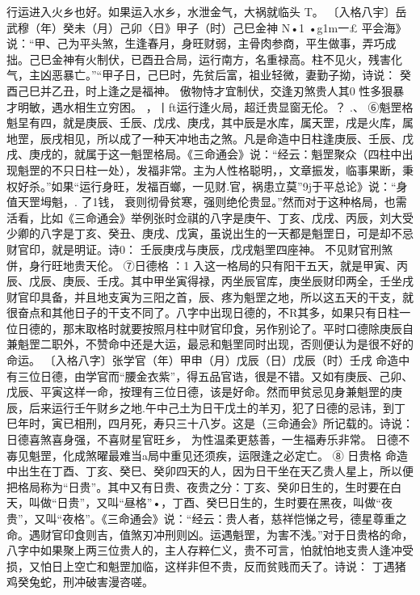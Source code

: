 行运进入火乡也好。如果运入水乡，水泄金气，大祸就临头
T。
〔入格八宇〕岳武穆（年）癸未（月）己卯〈日》甲子（时）己巳金神
N•1	•g1m一£
平会海》说：“甲、己为平头煞，生逢春月，身旺财弱，主骨肉参商，平生做事，弄巧成拙。己巳金神有火制伏，已酉丑合局，运行南方，名重禄高。柱不见火，残害化气，主凶恶暴亡。”“甲子日，己巳时，先贫后富，祖业轻微，妻勤子拗，诗说：
癸酉己巳并乙丑，时上逢之是福神。
傲物恃才宜制伏，交逢刃煞贵人其0
性多狠暴才明敏，遇水相生立穷困。
，丨ft运行逢火局，超迁贵显窗无伦。？	.、
⑥魁罡格
魁圼有四，就是庚辰、壬辰、戊戌、庚戌，其中辰是水库，属天罡，戌是火库，属地罡，辰戌相见，所以成了一种天冲地击之煞。凡是命造中日柱逢庚辰、壬辰、戊戌、庚戌的，就属于这一魁罡格局。《三命通会》说：“经云：魁罡聚众（四柱中出现魁罡的不只日柱一处），发福非常。主为人性格聪明，，文章振发，临事果断，秉权好杀。”如果“运行身旺，发福百螂，一见财.官，祸患立莫”9j于平总论》说：“身值天罡坶魁，.
了1钱，
衰则彻骨贫寒，强则绝伦贵显。”然而对于这种格局，也需活看，比如《三命通会》举例张时佥祺的八字是庚午、丁亥、戊戌、丙辰，刘大受少卿的八字是丁亥、癸丑、庚戌、戊寅，虽说出生的一天都是魁罡日，可是却不忌财官印，就是明证。诗0：
壬辰庚戌与庚辰，戊戌魁罜四座神。
不见财官刑煞併，身行旺地贵天伦。
⑦日德格	：1
入这一格局的只有阳干五天，就是甲寅、丙辰、戊辰、庚辰、壬戌。其中甲坐寅得禄，丙坐辰官库，庚坐辰财印两全，壬坐戌财官印具备，并且地支寅为三阳之首，辰、疼为魁罡之地，所以这五天的干支，就很奋点和其他日子的干支不同了。八字中出现日德的，不R其多，如果只有日柱一位日德的，那末取格时就要按照月柱中财官印食，另作别论了。平时口德除庚辰自兼魁罡二职外，不赞命中还是大运，最忌和魁罜同时出现，否则便认为是很不好的命运。
〔入格八字〕张学官（年）甲申（月）戊辰（日）戊辰（时）壬戌
命造中有三位日德，由学官而“腰金衣紫”，得五品官诰，很是不错。又如有庚辰、己卯、戊辰、平寅这样一命，按理有三位日德，该是好命。然而甲贫忌见身兼魁罡的庚辰，后来运行壬午财乡之地.午中己土为日干戊土的羊刃，犯了日德的忌讳，到丁巳年时，寅已相刑，四月死，寿只三十八岁。这是（三命通会》所记载的。诗说：
日德喜煞喜身强，不喜财星官旺乡，
为性温柔更慈善，一生福寿乐非常。
日德不毐见魁罡，化成煞曜最难当a局中重见还须疾，运限逢之必定亡。
⑧	日贵格
命造中出生在丁酉、丁亥、癸巳、癸卯四天的人，因为日干坐在天乙贵人星上，所以便把格局称为“日贵”。其中又有日贵、夜贵之分：丁亥、癸卯日生的，生时要在白天，叫做“日贵”，又叫“昼格”•，丁酉、癸巳日生的，生时要在黑夜，叫做“夜贵”，又叫“夜格”。《三命通会》说：“经云：贵人者，慈祥恺悌之号，德星尊重之命。遇财官印食则吉，值煞刃冲刑则凶。运遇魁罡，为害不浅。”对于日贵格的命，八字中如果聚上两三位贵人的，主人存粹仁义，贵不可言，怕就怕地支贵人逢冲受损，又怕日上空亡和魁罡加临，这样非但不贵，反而贫贱而夭了。诗说：
丁遇猪鸡癸兔蛇，刑冲破害漫咨嗟。
